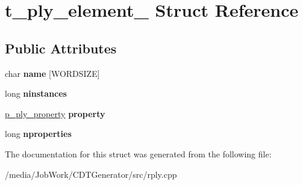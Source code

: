 \hypertarget{structt__ply__element__}{\section{t\-\_\-ply\-\_\-element\-\_\- Struct Reference}
\label{structt__ply__element__}
}
\subsection*{Public Attributes}
\begin{DoxyCompactItemize}
\item 
\hypertarget{structt__ply__element___a4190e367a648df18c038ef3cbe80e266}{char {\bfseries name} \mbox{[}W\-O\-R\-D\-S\-I\-Z\-E\mbox{]}}\label{structt__ply__element___a4190e367a648df18c038ef3cbe80e266}

\item 
\hypertarget{structt__ply__element___a742314a40fcbc69660907d9be9ae4927}{long {\bfseries ninstances}}\label{structt__ply__element___a742314a40fcbc69660907d9be9ae4927}

\item 
\hypertarget{structt__ply__element___adf2e07d9d09ac4c1152c396f88bf8ddc}{\hyperlink{structt__ply__property__}{p\-\_\-ply\-\_\-property} {\bfseries property}}\label{structt__ply__element___adf2e07d9d09ac4c1152c396f88bf8ddc}

\item 
\hypertarget{structt__ply__element___a604596912c74d0521a02561884c1ffa9}{long {\bfseries nproperties}}\label{structt__ply__element___a604596912c74d0521a02561884c1ffa9}

\end{DoxyCompactItemize}


The documentation for this struct was generated from the following file\-:\begin{DoxyCompactItemize}
\item 
/media/\-Job\-Work/\-C\-D\-T\-Generator/src/rply.\-cpp\end{DoxyCompactItemize}
